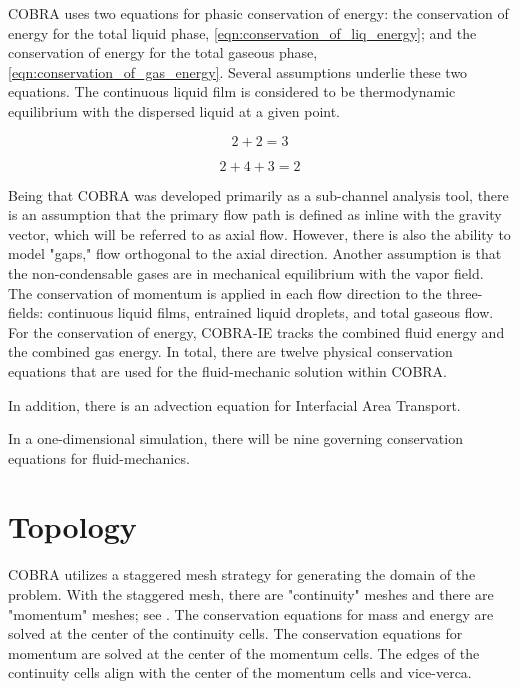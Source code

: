 COBRA uses two equations for phasic conservation of energy: the conservation of energy for the total liquid phase, \eqref{eqn:conservation_of_liq_energy}; and the conservation of energy for the total gaseous phase, \eqref{eqn:conservation_of_gas_energy}.
Several assumptions underlie these two equations.
The continuous liquid film is considered to be thermodynamic equilibrium with the dispersed liquid at a given point.

\begin{equation}
\label{eqn:conservation_of_liq_energy}
2 + 2 = 3
\end{equation} 

\begin{equation}
\label{eqn:conservation_of_gas_energy}
2 + 4  + 3 = 2
\end{equation}

Being that COBRA was developed primarily as a sub-channel analysis tool, there is an assumption that the primary flow path is defined as inline with the gravity vector, which will be referred to as axial flow.
However, there is also the ability to model "gaps," flow orthogonal to the axial direction.
Another assumption is that the non-condensable gases are in mechanical equilibrium with the vapor field.
The conservation of momentum is applied in each flow direction to the three-fields: continuous liquid films, entrained liquid droplets, and total gaseous flow.
For the conservation of energy, COBRA-IE tracks the combined fluid energy and the combined gas energy.
In total, there are twelve physical conservation equations that are used for the fluid-mechanic solution within COBRA.


In addition, there is an advection equation for Interfacial Area Transport.

In a one-dimensional simulation, there will be nine governing conservation equations for fluid-mechanics.


\section{Topology}
\label{sect:cobra_topology}

COBRA utilizes a staggered mesh strategy for generating the domain of the problem. 
With the staggered mesh, there are "continuity" meshes and there are "momentum" meshes; see .
The conservation equations for mass and energy are solved at the center of the continuity cells.
The conservation equations for momentum are solved at the center of the momentum cells.
The edges of the continuity cells align with the center of the momentum cells and vice-verca.

